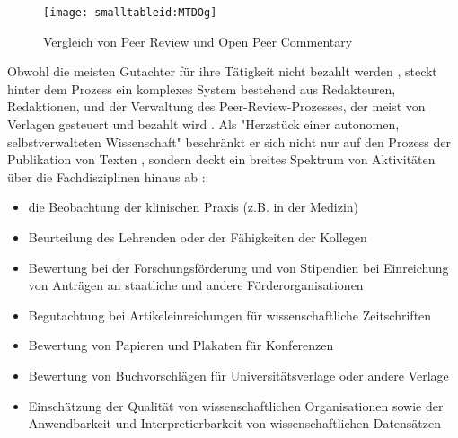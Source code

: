 \begin{figure}[h!]
\texttt{[image: smalltableid:MTDOg]}
\caption{Vergleich von Peer Review und Open Peer Commentary}
\end{figure}

Obwohl die meisten Gutachter für ihre Tätigkeit nicht bezahlt werden \cite{yiotis_2013_open}, steckt hinter dem Prozess ein komplexes System bestehend aus Redakteuren, Redaktionen, und der Verwaltung des Peer-Review-Prozesses, der meist von Verlagen gesteuert und bezahlt wird \cite{Bargheer_2015} \cite{mueller_2009_peerreview} \cite{Baggs_2006}. Als "Herzstück einer autonomen, selbstverwalteten Wissenschaft" \cite[:5]{Neidhardt_2006} beschränkt er sich nicht nur auf den Prozess der Publikation von Texten \cite{mueller_2009_peerreview}, sondern deckt ein breites Spektrum von Aktivitäten über die Fachdisziplinen hinaus ab \cite{Lee_2012}:
\begin{itemize}
\item die Beobachtung der klinischen Praxis (z.B. in der Medizin)
\item Beurteilung des Lehrenden oder der Fähigkeiten der Kollegen
\item Bewertung bei der Forschungsförderung und von Stipendien bei Einreichung von Anträgen an staatliche und andere Förderorganisationen
\item Begutachtung bei Artikeleinreichungen für wissenschaftliche Zeitschriften
\item Bewertung von Papieren und Plakaten für Konferenzen
\item Bewertung von Buchvorschlägen für Universitätsverlage oder andere Verlage
\item Einschätzung der Qualität von wissenschaftlichen Organisationen sowie der Anwendbarkeit und Interpretierbarkeit von wissenschaftlichen Datensätzen
\end{itemize}

